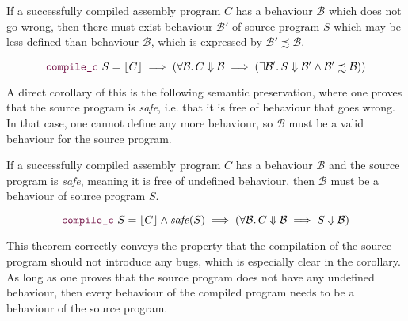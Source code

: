 \begin{theorem}\label{thm:semantic-preservation}
  If a successfully compiled assembly program $C$ has a behaviour $\mathcal{B}$ which does
  not go wrong, then there must exist behaviour $\mathcal{B}'$ of source program $S$ which
  may be less defined than behaviour $\mathcal{B}$, which is expressed by $\mathcal{B}' \precsim \mathcal{B}$.

  {\normalfont\begin{equation*}
      \yhfunction{compile\_c}\ S = \ccok{C}
      \implies (\forall \mathcal{B}\ldotp C \Downarrow \mathcal{B} \implies (\exists \mathcal{B}'\ldotp S
      \Downarrow \mathcal{B}' \land \mathcal{B}' \precsim \mathcal{B}))
  \end{equation*}}
\end{theorem}

A direct corollary of this is the following semantic preservation, where one
proves that the source program is \emph{safe}, i.e. that it is free of behaviour
that goes wrong.  In that case, one cannot define any more behaviour, so $\mathcal{B}$
must be a valid behaviour for the source program.

\begin{corollary}
  If a successfully compiled assembly program $C$ has a behaviour $\mathcal{B}$ and the
  source program is \emph{safe}, meaning it is free of undefined behaviour, then
  $\mathcal{B}$ must be a behaviour of source program $S$.

  {\normalfont\begin{equation*} \yhfunction{compile\_c}\ S = \ccok{C}
      \land \mathit{safe}(S) \implies (\forall \mathcal{B}\ldotp C \Downarrow \mathcal{B} \implies S
      \Downarrow \mathcal{B})
  \end{equation*}}
\end{corollary}

This theorem correctly conveys the property that the compilation of the source
program should not introduce any bugs, which is especially clear in the
corollary.  As long as one proves that the source program does not have any
undefined behaviour, then every behaviour of the compiled program needs to be a
behaviour of the source program.

